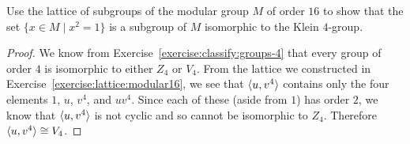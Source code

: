  Use the lattice of subgroups of the modular group $M$ of
order $16$ to show that the set $\{x\in M\mid x^2 = 1\}$ is a subgroup
of $M$ isomorphic to the Klein $4$-group.
\begin{proof}
  We know from Exercise~\ref{exercise:classify:groups-4} that every
  group of order $4$ is isomorphic to either $Z_4$ or $V_4$. From the
  lattice we constructed in Exercise~\ref{exercise:lattice:modular16},
  we see that $\langle{u,v^4}\rangle$ contains only the four elements $1$, $u$,
  $v^4$, and $uv^4$. Since each of these (aside from $1$) has order
  $2$, we know that $\langle{u,v^4}\rangle$ is not cyclic and so cannot be
  isomorphic to $Z_4$. Therefore $\langle{u,v^4}\rangle\cong V_4$.
\end{proof}
